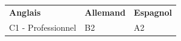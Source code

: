 
\begin{tabularx}{\textwidth}{
>{\raggedright\arraybackslash}X
>{\raggedright\arraybackslash}X
>{\raggedright\arraybackslash}X
}

\textbf{Anglais} &
\textbf{Allemand} &
\textbf{Espagnol} \\

C1 - Professionnel &
B2 &
A2\\

\end{tabularx}
